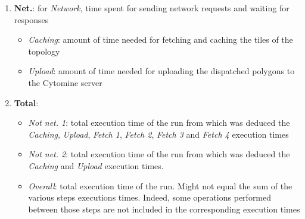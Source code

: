 \begin{enumerate}
\begin{itemize}
	\end{itemize}
	\item \textbf{Net.}: for \textit{Network}, time spent for sending network requests and waiting for responses
	\begin{itemize}
		\item \textit{Caching}: amount of time needed for fetching and caching the tiles of the topology
		\item \textit{Upload}: amount of time needed for uploading the dispatched polygons to the Cytomine server
	\end{itemize}
	\item \textbf{Total}: 
	\begin{itemize}
		\item \textit{Not net. 1}: total execution time of the run from which was deduced the \textit{Caching}, \textit{Upload}, \textit{Fetch 1}, \textit{Fetch 2}, \textit{Fetch 3} and \textit{Fetch 4} execution times
		\item \textit{Not net. 2}: total execution time of the run from which was deduced the \textit{Caching} and \textit{Upload} execution times. 
		\item \textit{Overall}: total execution time of the run. Might not equal the sum of the various steps executions times. Indeed, some operations performed between those steps are not included in the corresponding execution times
	\end{itemize}		
	
\end{enumerate}

